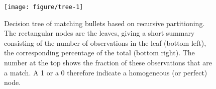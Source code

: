 \documentclass[aoas, preprint]{imsart}\usepackage[]{graphicx}\usepackage[]{color}
\newenvironment{knitrout}{}{} %
\begin{document}
\begin{figure}[hbtp]
  \centering
\begin{knitrout}
\color{fgcolor}
\texttt{[image: figure/tree-1]} 

\end{knitrout}
\caption{\label{fig:tree}Decision tree of matching bullets based on recursive partitioning. The rectangular nodes are the leaves, giving a short summary consisting of the number of observations in the leaf (bottom left), the corresponding percentage of the total (bottom right). The number at the top shows the fraction of these observations that are a match. A 1 or a 0 therefore indicate a homogeneous (or perfect) node. }
\end{figure}
\end{document}
